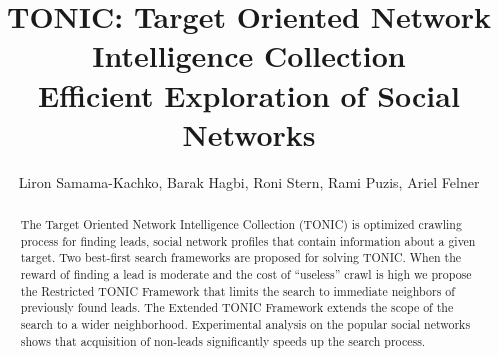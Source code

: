 \documentclass[prodmode,acmtecs]{acmsmall} %
\title{TONIC: Target Oriented Network Intelligence Collection \\
{\large Efficient Exploration of Social Networks}}
\author{Liron Samama-Kachko, Barak Hagbi, Roni Stern, Rami Puzis,  Ariel Felner
\affil{Ben-Gurion University of the Negev}
}
\newcommand{\note}[2]{\textbf{\textsc{#1} says: \textit{#2}}}
\begin{document}


\begin{abstract}
The Target Oriented Network Intelligence Collection (TONIC) is optimized crawling process for finding leads, social network profiles that contain information about a given target.  Two best-first search frameworks are proposed for solving TONIC. When the reward of finding a lead is moderate and the cost of ``useless'' crawl is high we propose the Restricted TONIC Framework that limits the search to immediate neighbors of previously found leads. The Extended TONIC Framework extends the scope of the search to a wider neighborhood. Experimental analysis on the popular social networks shows that acquisition of non-leads significantly speeds up the search process. 




\end{abstract}
\end{document}
